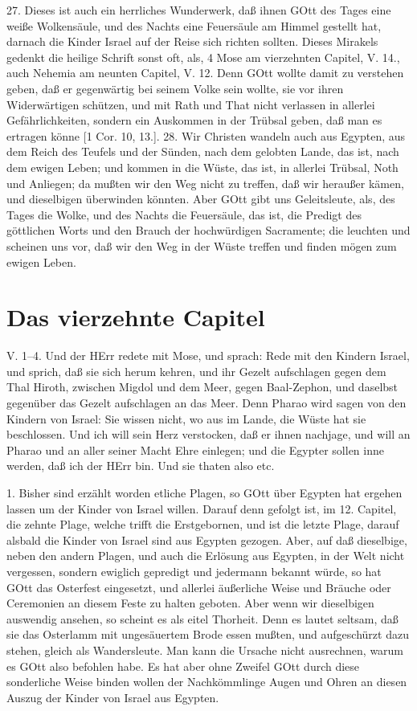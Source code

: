 27. Dieses ist auch ein herrliches Wunderwerk, daß ihnen GOtt des Tages eine weiße Wolkensäule, und des Nachts eine Feuersäule am Himmel gestellt hat, darnach die Kinder Israel auf der Reise sich richten sollten. Dieses Mirakels gedenkt die heilige Schrift sonst oft, als, 4 Mose am vierzehnten Capitel, V. 14., auch Nehemia am neunten Capitel, V. 12. Denn GOtt wollte damit zu verstehen geben, daß er gegenwärtig bei seinem Volke sein wollte, sie vor ihren Widerwärtigen schützen, und mit Rath und That nicht verlassen in allerlei Gefährlichkeiten, sondern ein Auskommen in der Trübsal
geben, daß man es ertragen könne [1 Cor. 10, 13.]. 28. Wir Christen wandeln auch aus Egypten, aus dem Reich des Teufels und der Sünden, nach dem gelobten Lande, das ist, nach dem ewigen Leben; und kommen in die Wüste, das ist, in allerlei Trübsal, Noth und Anliegen; da mußten wir den Weg nicht zu treffen, daß wir heraußer kämen, und dieselbigen überwinden könnten. Aber GOtt gibt uns Geleitsleute, als, des Tages die Wolke, und des Nachts die Feuersäule, das ist, die Predigt des göttlichen Worts und den Brauch der hochwürdigen Sacramente; die leuchten und scheinen uns vor, daß wir den Weg in der Wüste treffen und finden mögen zum ewigen Leben.

\section{Das vierzehnte Capitel}

\begin{schriftzitat}
V. 1–4. Und der HErr redete mit Mose, und sprach: Rede mit den Kindern Israel, und sprich, daß sie sich herum kehren, und ihr Gezelt aufschlagen gegen dem Thal Hiroth, zwischen Migdol und dem Meer, gegen Baal-Zephon, und daselbst gegenüber das Gezelt aufschlagen an das Meer. Denn Pharao wird sagen von den Kindern von Israel: Sie wissen nicht, wo aus im Lande, die Wüste hat sie beschlossen. Und ich will sein Herz verstocken, daß er ihnen nachjage, und will an Pharao und an aller seiner Macht Ehre einlegen; und die Egypter sollen inne werden, daß ich der HErr bin. Und sie thaten also etc.
\end{schriftzitat}

1. Bisher sind erzählt worden etliche Plagen, so GOtt über Egypten hat ergehen lassen um der Kinder von Israel willen. Darauf denn gefolgt ist, im 12. Capitel, die zehnte Plage, welche trifft die Erstgebornen, und ist die letzte Plage, darauf alsbald die Kinder von Israel sind aus Egypten gezogen. Aber, auf daß dieselbige, neben den andern Plagen, und auch die Erlösung aus Egypten, in der Welt nicht vergessen, sondern ewiglich gepredigt und jedermann bekannt würde, so hat GOtt das Osterfest eingesetzt, und allerlei äußerliche Weise und Bräuche oder Ceremonien an diesem Feste zu halten geboten. Aber wenn wir dieselbigen auswendig ansehen, so scheint es als eitel Thorheit. Denn es lautet seltsam, daß sie das Osterlamm mit ungesäuertem Brode essen mußten, und aufgeschürzt dazu stehen, gleich als Wandersleute. Man kann die Ursache nicht ausrechnen, warum es GOtt also befohlen habe. Es hat aber ohne Zweifel GOtt durch diese sonderliche Weise binden wollen der Nachkömmlinge Augen und Ohren an diesen Auszug der Kinder von Israel aus Egypten.

